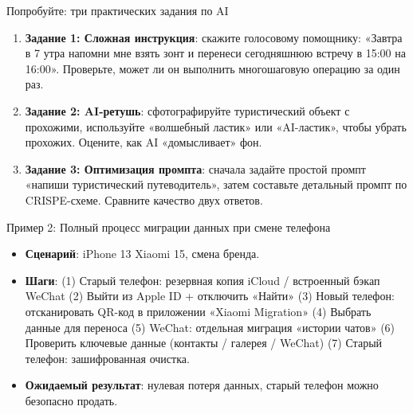 \begin{tcbpractice}{Попробуйте: три практических задания по AI}
\begin{enumerate}
  \item \textbf{Задание 1: Сложная инструкция}: скажите голосовому помощнику: «Завтра в 7 утра напомни мне взять зонт и перенеси сегодняшнюю встречу в 15:00 на 16:00». Проверьте, может ли он выполнить многошаговую операцию за один раз.
  \item \textbf{Задание 2: AI-ретушь}: сфотографируйте туристический объект с прохожими, используйте «волшебный ластик» или «AI-ластик», чтобы убрать прохожих. Оцените, как AI «домысливает» фон.
  \item \textbf{Задание 3: Оптимизация промпта}: сначала задайте простой промпт «напиши туристический путеводитель», затем составьте детальный промпт по CRISPE-схеме. Сравните качество двух ответов.
\end{enumerate}

\end{tcbpractice}

\begin{tcbinfo}{Пример 2: Полный процесс миграции данных при смене телефона}
\begin{itemize}
  \item \textbf{Сценарий}: iPhone 13 Xiaomi 15, смена бренда.
  \item \textbf{Шаги}: (1) Старый телефон: резервная копия iCloud / встроенный бэкап WeChat (2) Выйти из Apple ID + отключить «Найти» (3) Новый телефон: отсканировать QR-код в приложении «Xiaomi Migration» (4) Выбрать данные для переноса (5) WeChat: отдельная миграция «истории чатов» (6) Проверить ключевые данные (контакты / галерея / WeChat) (7) Старый телефон: зашифрованная очистка.
  \item \textbf{Ожидаемый результат}: нулевая потеря данных, старый телефон можно безопасно продать.
\end{itemize}

\end{tcbinfo}
